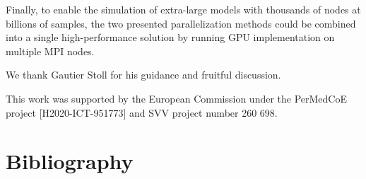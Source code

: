 \documentclass[times, twoside]{zHenriquesLab-StyleBioRxiv}
\begin{document}
Finally, to enable the simulation of extra-large models with thousands of nodes at billions of samples, the two presented parallelization methods could be combined into a single high-performance solution by running GPU implementation on multiple MPI nodes.


\begin{acknowledgements}
We thank Gautier Stoll for his guidance and fruitful discussion.
\end{acknowledgements}

\begin{funding}
This work was supported by the European Commission under the PerMedCoE project [H2020-ICT-951773] and SVV project number 260 698.
\end{funding}


\section*{Bibliography}


\onecolumn
\newpage


\end{document}
